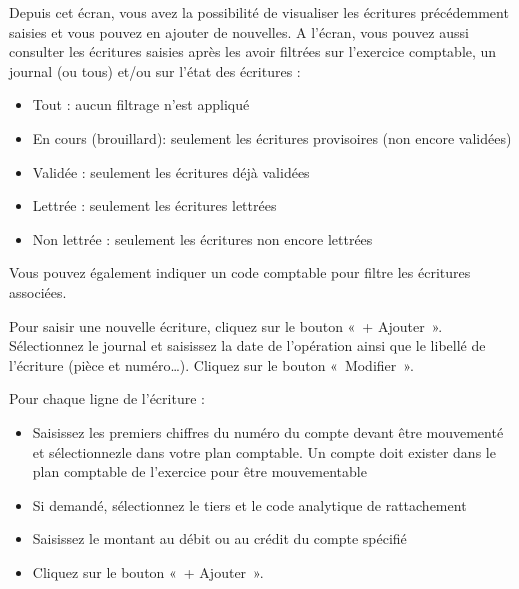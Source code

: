 \documentclass[a4paper,10pt,oneside,french]{sphinxmanual}
\begin{document}
\sphinxAtStartPar
Depuis cet écran, vous avez la possibilité de visualiser les écritures précédemment saisies et vous pouvez en ajouter de nouvelles.
A l’écran, vous pouvez aussi consulter les écritures saisies après les avoir filtrées sur l’exercice comptable, un journal (ou tous)  et/ou sur l’état des écritures :
\begin{itemize}
\item {} 
\sphinxAtStartPar
Tout : aucun filtrage n’est appliqué

\item {} 
\sphinxAtStartPar
En cours (brouillard): seulement les écritures provisoires (non encore validées)

\item {} 
\sphinxAtStartPar
Validée : seulement les écritures déjà validées

\item {} 
\sphinxAtStartPar
Lettrée : seulement les écritures lettrées

\item {} 
\sphinxAtStartPar
Non lettrée : seulement les écritures non encore lettrées

\end{itemize}

\sphinxAtStartPar
Vous pouvez également indiquer un code comptable pour filtre les écritures associées.

\sphinxAtStartPar
Pour saisir une nouvelle écriture, cliquez sur le bouton « + Ajouter ».
Sélectionnez le journal et saisissez la date de l’opération ainsi que le libellé de l’écriture (pièce et numéro…). Cliquez sur le bouton « Modifier ».

\sphinxAtStartPar
Pour chaque ligne de l’écriture :
\begin{itemize}
\item {} 
\sphinxAtStartPar
Saisissez les premiers chiffres du numéro du compte devant être mouvementé et sélectionnez\sphinxhyphen{}le dans votre plan comptable. Un compte doit exister dans le plan comptable de l’exercice pour être mouvementable

\item {} 
\sphinxAtStartPar
Si demandé, sélectionnez le tiers et le code analytique de rattachement

\item {} 
\sphinxAtStartPar
Saisissez le montant au débit ou au crédit du compte spécifié

\item {} 
\sphinxAtStartPar
Cliquez sur le bouton « + Ajouter ».

\end{itemize}
\end{document}
